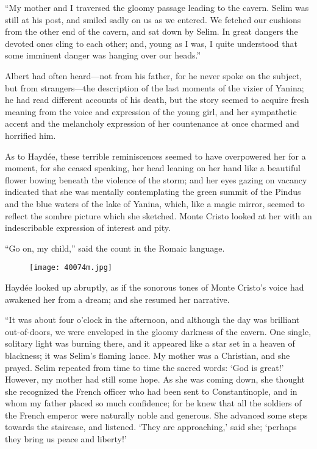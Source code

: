 “My mother and I traversed the gloomy passage leading to the cavern.
Selim was still at his post, and smiled sadly on us as we entered. We
fetched our cushions from the other end of the cavern, and sat down by
Selim. In great dangers the devoted ones cling to each other; and,
young as I was, I quite understood that some imminent danger was
hanging over our heads.”

Albert had often heard—not from his father, for he never spoke on the
subject, but from strangers—the description of the last moments of the
vizier of Yanina; he had read different accounts of his death, but the
story seemed to acquire fresh meaning from the voice and expression of
the young girl, and her sympathetic accent and the melancholy
expression of her countenance at once charmed and horrified him.

As to Haydée, these terrible reminiscences seemed to have overpowered
her for a moment, for she ceased speaking, her head leaning on her hand
like a beautiful flower bowing beneath the violence of the storm; and
her eyes gazing on vacancy indicated that she was mentally
contemplating the green summit of the Pindus and the blue waters of the
lake of Yanina, which, like a magic mirror, seemed to reflect the
sombre picture which she sketched. Monte Cristo looked at her with an
indescribable expression of interest and pity.

“Go on, my child,” said the count in the Romaic language.

\begin{figure}[ht]
\texttt{[image: 40074m.jpg]}
\end{figure}

Haydée looked up abruptly, as if the sonorous tones of Monte Cristo’s
voice had awakened her from a dream; and she resumed her narrative.

“It was about four o’clock in the afternoon, and although the day was
brilliant out-of-doors, we were enveloped in the gloomy darkness of the
cavern. One single, solitary light was burning there, and it appeared
like a star set in a heaven of blackness; it was Selim’s flaming lance.
My mother was a Christian, and she prayed. Selim repeated from time to
time the sacred words: ‘God is great!’ However, my mother had still
some hope. As she was coming down, she thought she recognized the
French officer who had been sent to Constantinople, and in whom my
father placed so much confidence; for he knew that all the soldiers of
the French emperor were naturally noble and generous. She advanced some
steps towards the staircase, and listened. ‘They are approaching,’ said
she; ‘perhaps they bring us peace and liberty!’

